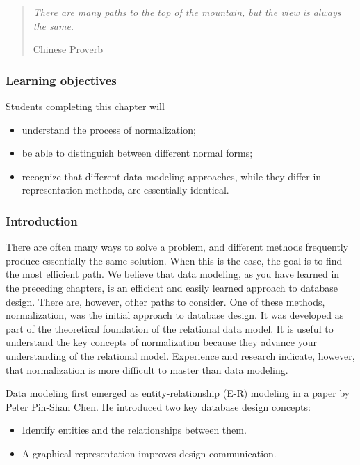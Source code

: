 \documentclass[
]{article}
\begin{document}
\begin{quote}
\emph{There are many paths to the top of the mountain, but the view is
always the same.}

Chinese Proverb
\end{quote}

\hypertarget{learning-objectives-7}{%
\subsubsection*{Learning objectives}\label{learning-objectives-7}}

Students completing this chapter will

\begin{itemize}
\item
  understand the process of normalization;
\item
  be able to distinguish between different normal forms;
\item
  recognize that different data modeling approaches, while they differ
  in representation methods, are essentially identical.
\end{itemize}

\hypertarget{introduction-2}{%
\subsubsection*{Introduction}\label{introduction-2}}

There are often many ways to solve a problem, and different methods
frequently produce essentially the same solution. When this is the case,
the goal is to find the most efficient path. We believe that data
modeling, as you have learned in the preceding chapters, is an efficient
and easily learned approach to database design. There are, however,
other paths to consider. One of these methods, normalization, was the
initial approach to database design. It was developed as part of the
theoretical foundation of the relational data model. It is useful to
understand the key concepts of normalization because they advance your
understanding of the relational model. Experience and research indicate,
however, that normalization is more difficult to master than data
modeling.

Data modeling first emerged as entity-relationship (E-R) modeling in a
paper by Peter Pin-Shan Chen. He introduced two key database design
concepts:

\begin{itemize}
\item
  Identify entities and the relationships between them.
\item
  A graphical representation improves design communication.
\end{itemize}
\end{document}
